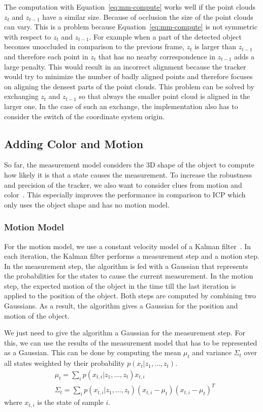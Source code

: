 \documentclass[twoside,a4paper,article]{combine}
\begin{document}
The computation with Equation~\ref{eq:mm-compute} works well if the
point clouds $z_t$ and $z_{t-1}$ have a similar size. Because of
occlusion the size of the point clouds can vary. This is a problem
because Equation~\ref{eq:mm-compute} is not symmetric with respect to
$z_t$ and $z_{t-1}$. For example when a part of the detected object
becomes unoccluded in comparison to the previous frame, $z_t$ is
larger than $z_{t-1}$ and therefore each point in $z_t$ that has no
nearby correspondence in $z_{t-1}$ adds a large penalty. This would
result in an incorrect alignment because the tracker would try to
minimize the number of badly aligned points and therefore focuses on
aligning the densest parts of the point clouds. This problem can be
solved by exchanging $z_t$ and $z_{t-1}$ so that always the smaller
point cloud is aligned in the larger one. In the case of such an
exchange, the implementation also has to consider the switch of the
coordinate system origin.

\subsection{Adding Color and Motion}
\label{sub:adding-color}
So far, the measurement model considers the 3D shape of the object to
compute how likely it is that a state causes the measurement.
To increase the robustness and precision of the tracker, we
also want to consider clues from motion and color~\cite{paper}. This especially
improves the performance in comparison to ICP which only uses the
object shape and has no motion model.

\subsubsection{Motion Model}
For the motion model, we use a constant velocity model of a Kalman
filter~\cite{prob-rob}. In each iteration, the Kalman filter performs
a measurement step and a motion step. In the measurement step, the algorithm
is fed with a Gaussian that represents the
probabilities for the states to cause the current
measurement. In the motion step, the
expected motion of the object in the time till the last iteration is
applied to the position of the object. Both steps are computed by
combining two Gaussians. As a result, the algorithm gives a Gaussian
for the position and motion of the object.

We just need to give the algorithm a Gaussian for the measurement
step. For this, we can use the results of the measurement model that
has to be represented as a Gaussian. This can be done by computing
the mean $\mu_t$ and variance $\Sigma_t$ over all states weighted by
their probability $p(x_t|z_1,...,z_t)$.
\begin{align}
\label{eq:motion-model}
& \mu_t=\sum_i p(x_{t,i}|z_1,...,z_t)x_{t,i}\nonumber\\
& \Sigma_t=\sum_i p(x_{t,i}|z_1,...,z_t) (x_{t,i}-\mu_t)(x_{t,i}-\mu_t)^T\nonumber
\end{align}
where $x_{t,i}$ is the state of sample $i$.
\end{document}
